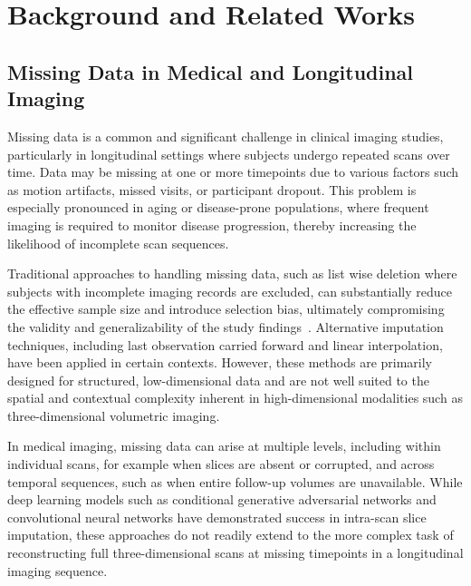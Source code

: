 \section{Background and Related Works}

\subsection{Missing Data in Medical and Longitudinal Imaging}

Missing data is a common and significant challenge in clinical imaging studies, particularly in longitudinal settings where subjects undergo repeated scans over time. Data may be missing at one or more timepoints due to various factors such as motion artifacts, missed visits, or participant dropout. This problem is especially pronounced in aging or disease-prone populations, where frequent imaging is required to monitor disease progression, thereby increasing the likelihood of incomplete scan sequences.

Traditional approaches to handling missing data, such as list wise deletion where subjects with incomplete imaging records are excluded, can substantially reduce the effective sample size and introduce selection bias, ultimately compromising the validity and generalizability of the study findings~\cite{little2009,bell2023}. Alternative imputation techniques, including last observation carried forward and linear interpolation, have been applied in certain contexts. However, these methods are primarily designed for structured, low-dimensional data and are not well suited to the spatial and contextual complexity inherent in high-dimensional modalities such as three-dimensional volumetric imaging.

In medical imaging, missing data can arise at multiple levels, including within individual scans, for example when slices are absent or corrupted, and across temporal sequences, such as when entire follow-up volumes are unavailable. While deep learning models such as conditional generative adversarial networks and convolutional neural networks have demonstrated success in intra-scan slice imputation, these approaches do not readily extend to the more complex task of reconstructing full three-dimensional scans at missing timepoints in a longitudinal imaging sequence.

